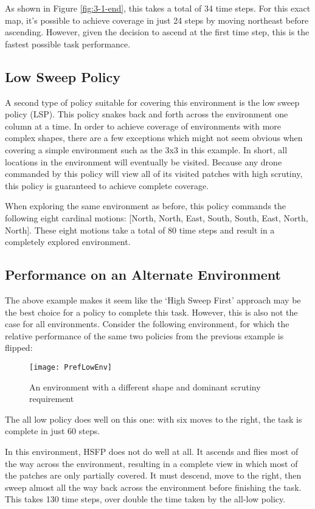 As shown in Figure \ref{fig:3-1-end}, this takes a total of 34 time steps. For this exact map, it's possible to achieve coverage in just 24 steps by moving northeast before ascending. However, given the decision to ascend at the first time step, this is the fastest possible task performance.

\subsection{Low Sweep Policy}

A second type of policy suitable for covering this environment is the low sweep policy (LSP). This policy snakes back and forth across the environment one column at a time. In order to achieve coverage of environments with more complex shapes, there are a few exceptions which might not seem obvious when covering a simple environment such as the 3x3 in this example. In short, all locations in the environment will eventually be visited. Because any drone commanded by this policy will view all of its visited patches with high scrutiny, this policy is guaranteed to achieve complete coverage.

When exploring the same environment as before, this policy commands the following eight cardinal motions: [North, North, East, South, South, East, North, North]. These eight motions take a total of 80 time steps and result in a completely explored environment.

\subsection{Performance on an Alternate Environment}

The above example makes it seem like the `High Sweep First' approach may be the best choice for a policy to complete this task. However, this is also not the case for all environments. Consider the following environment, for which the relative performance of the same two policies from the previous example is flipped:

\begin{figure}[H]
\texttt{[image: PrefLowEnv]}
\caption[Long Thin Environment]{An environment with a different shape and dominant scrutiny requirement}
\label{fig:3-2-env}
\end{figure}

The all low policy does well on this one: with six moves to the right, the task is complete in just 60 steps.

In this environment, HSFP does not do well at all. It ascends and flies most of the way across the environment, resulting in a complete view in which most of the patches are only partially covered. It must descend, move to the right, then sweep almost all the way back across the environment before finishing the task. This takes 130 time steps, over double the time taken by the all-low policy.

